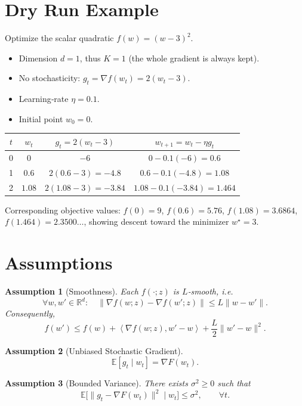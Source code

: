 \documentclass{article}
\newcommand{\E}{\mathbb{E}}
\newcommand{\R}{\mathbb{R}}
\newcommand{\iprod}[2]{\left\langle #1,#2\right\rangle}
\newtheorem{assumption}{Assumption}
\begin{document}
\section*{Dry Run Example}
Optimize the scalar quadratic $f(w)=(w-3)^2$.
\begin{itemize}
    \item Dimension $d=1$, thus $K=1$ (the whole gradient is always kept).
    \item No stochasticity: $g_t=\nabla f(w_t)=2(w_t-3)$.
    \item Learning‑rate $\eta=0.1$.
    \item Initial point $w_0=0$.
\end{itemize}
\begin{center}
\begin{tabular}{c|c|c|c}
$t$ & $w_t$ & $g_t=2(w_t-3)$ & $w_{t+1}=w_t-\eta g_t$\\\midrule
0 & $0$ & $-6$ & $0-0.1(-6)=0.6$\\
1 & $0.6$ & $2(0.6-3)=-4.8$ & $0.6-0.1(-4.8)=1.08$\\
2 & $1.08$ & $2(1.08-3)=-3.84$ & $1.08-0.1(-3.84)=1.464$\\
\end{tabular}
\end{center}
Corresponding objective values:
$f(0)=9$, $f(0.6)=5.76$, $f(1.08)=3.6864$, $f(1.464)=2.3500\ldots$,
showing descent toward the minimizer $w^\star=3$.

\newpage
\section*{Assumptions}
\begin{assumption}[Smoothness]
\label{ass:smooth}
Each $f(\cdot;z)$ is $L$‑smooth, i.e.
\[
\forall w,w'\in\R^d:\quad
\|\nabla f(w;z)-\nabla f(w';z)\|\le L\|w-w'\|.
\]
Consequently,
\[
f(w')\le f(w)+\iprod{\nabla f(w;z)}{w'-w}+\frac{L}{2}\|w'-w\|^2.
\]
\end{assumption}

\begin{assumption}[Unbiased Stochastic Gradient]
\label{ass:unbiased}
\[
\E[g_t\mid w_t]=\nabla F(w_t).
\]
\end{assumption}

\begin{assumption}[Bounded Variance]
\label{ass:variance}
There exists $\sigma^2\ge0$ such that
\[
\E\big[\|g_t-\nabla F(w_t)\|^2\mid w_t\big]\le\sigma^2,\qquad\forall t.
\]
\end{assumption}
\end{document}
